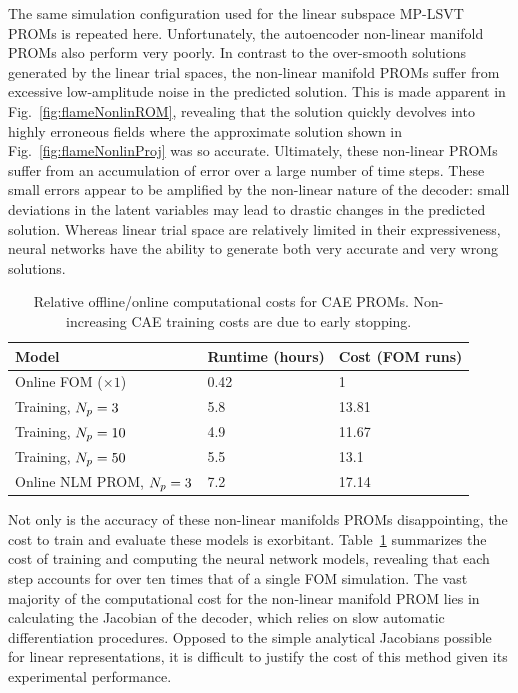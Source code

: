 The same simulation configuration used for the linear subspace MP-LSVT PROMs is repeated here. Unfortunately, the autoencoder non-linear manifold PROMs also perform very poorly. In contrast to the over-smooth solutions generated by the linear trial spaces, the non-linear manifold PROMs suffer from excessive low-amplitude noise in the predicted solution. This is made apparent in Fig.~\ref{fig:flameNonlinROM}, revealing that the solution quickly devolves into highly erroneous fields where the approximate solution shown in Fig.~\ref{fig:flameNonlinProj} was so accurate. Ultimately, these non-linear PROMs suffer from an accumulation of error over a large number of time steps. These small errors appear to be amplified by the non-linear nature of the decoder: small deviations in the latent variables may lead to drastic changes in the predicted solution. Whereas linear trial space are relatively limited in their expressiveness, neural networks have the ability to generate both very accurate and very wrong solutions.

\begin{table}
	\centering
	\begin{tabular}{ lll }
	\toprule
	Model & Runtime (hours) & Cost (FOM runs)  \\
	\midrule
    Online FOM ($\times 1$) & 0.42 & 1 \\
    Training, $N_p = 3$ & 5.8 & 13.81 \\
    Training, $N_p = 10$ & 4.9 & 11.67 \\
    Training, $N_p = 50$ & 5.5 & 13.1 \\
    Online NLM PROM, $N_p = 3$ & 7.2 & 17.14 \\
	\bottomrule
	\end{tabular}
	\caption{\label{tab:caeCost}Relative offline/online computational costs for CAE PROMs. Non-increasing CAE training costs are due to early stopping.}
\end{table}

Not only is the accuracy of these non-linear manifolds PROMs disappointing, the cost to train and evaluate these models is exorbitant. Table~\ref{tab:caeCost} summarizes the cost of training and computing the neural network models, revealing that each step accounts for over ten times that of a single FOM simulation. The vast majority of the computational cost for the non-linear manifold PROM lies in calculating the Jacobian of the decoder, which relies on slow automatic differentiation procedures. Opposed to the simple analytical Jacobians possible for linear representations, it is difficult to justify the cost of this method given its experimental performance.

